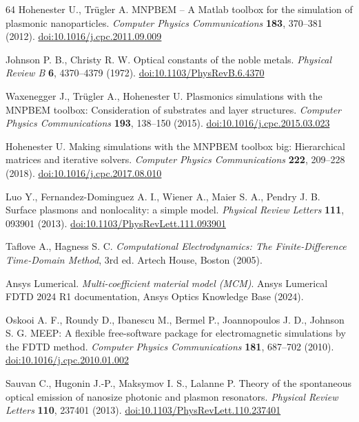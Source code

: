 \begin{thebibliography}{64}
 Hohenester U., Trügler A. MNPBEM -- A Matlab toolbox for the simulation of plasmonic nanoparticles. \textit{Computer Physics Communications} \textbf{183}, 370--381 (2012). \href{https://doi.org/10.1016/j.cpc.2011.09.009}{doi:10.1016/j.cpc.2011.09.009}

 Johnson P. B., Christy R. W. Optical constants of the noble metals. \textit{Physical Review B} \textbf{6}, 4370--4379 (1972). \href{https://doi.org/10.1103/PhysRevB.6.4370}{doi:10.1103/PhysRevB.6.4370}

 Waxenegger J., Trügler A., Hohenester U. Plasmonics simulations with the MNPBEM toolbox: Consideration of substrates and layer structures. \textit{Computer Physics Communications} \textbf{193}, 138--150 (2015). \href{https://doi.org/10.1016/j.cpc.2015.03.023}{doi:10.1016/j.cpc.2015.03.023}

 Hohenester U. Making simulations with the MNPBEM toolbox big: Hierarchical matrices and iterative solvers. \textit{Computer Physics Communications} \textbf{222}, 209--228 (2018). \href{https://doi.org/10.1016/j.cpc.2017.08.010}{doi:10.1016/j.cpc.2017.08.010}

 Luo Y., Fernandez-Dominguez A. I., Wiener A., Maier S. A., Pendry J. B. Surface plasmons and nonlocality: a simple model. \textit{Physical Review Letters} \textbf{111}, 093901 (2013). \href{https://doi.org/10.1103/PhysRevLett.111.093901}{doi:10.1103/PhysRevLett.111.093901}

 Taflove A., Hagness S. C. \textit{Computational Electrodynamics: The Finite-Difference Time-Domain Method}, 3rd ed. Artech House, Boston (2005).

 Ansys Lumerical. \textit{Multi-coefficient material model (MCM)}. Ansys Lumerical FDTD 2024 R1 documentation, Ansys Optics Knowledge Base (2024).

 Oskooi A. F., Roundy D., Ibanescu M., Bermel P., Joannopoulos J. D., Johnson S. G. MEEP: A flexible free-software package for electromagnetic simulations by the FDTD method. \textit{Computer Physics Communications} \textbf{181}, 687--702 (2010). \href{https://doi.org/10.1016/j.cpc.2010.01.002}{doi:10.1016/j.cpc.2010.01.002}

 Sauvan C., Hugonin J.-P., Maksymov I. S., Lalanne P. Theory of the spontaneous optical emission of nanosize photonic and plasmon resonators. \textit{Physical Review Letters} \textbf{110}, 237401 (2013). \href{https://doi.org/10.1103/PhysRevLett.110.237401}{doi:10.1103/PhysRevLett.110.237401}


\end{thebibliography}
